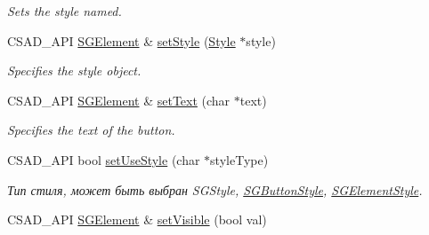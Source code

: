 \begin{DoxyCompactItemize}
\begin{DoxyCompactList}\small\item\em Sets the style named. \end{DoxyCompactList}\item 
\hypertarget{classcsad_1_1_s_g_element_a02334a35ff799bc536e2cf25a53b353e}{C\-S\-A\-D\-\_\-\-A\-P\-I \hyperlink{classcsad_1_1_s_g_element}{S\-G\-Element} \& \hyperlink{classcsad_1_1_s_g_element_a02334a35ff799bc536e2cf25a53b353e}{set\-Style} (\hyperlink{classcsad_1_1_style}{Style} $\ast$style)}\label{classcsad_1_1_s_g_element_a02334a35ff799bc536e2cf25a53b353e}

\begin{DoxyCompactList}\small\item\em Specifies the style object. \end{DoxyCompactList}\item 
\hypertarget{classcsad_1_1_s_g_element_a777e02caefe6abcaa394d0154528bac2}{C\-S\-A\-D\-\_\-\-A\-P\-I \hyperlink{classcsad_1_1_s_g_element}{S\-G\-Element} \& \hyperlink{classcsad_1_1_s_g_element_a777e02caefe6abcaa394d0154528bac2}{set\-Text} (char $\ast$text)}\label{classcsad_1_1_s_g_element_a777e02caefe6abcaa394d0154528bac2}

\begin{DoxyCompactList}\small\item\em Specifies the text of the button. \end{DoxyCompactList}\item 
\hypertarget{classcsad_1_1_s_g_element_a551b2c79b8d094ad1c525601644d0270}{C\-S\-A\-D\-\_\-\-A\-P\-I bool \hyperlink{classcsad_1_1_s_g_element_a551b2c79b8d094ad1c525601644d0270}{set\-Use\-Style} (char $\ast$style\-Type)}\label{classcsad_1_1_s_g_element_a551b2c79b8d094ad1c525601644d0270}

\begin{DoxyCompactList}\small\item\em Тип стиля, может быть выбран S\-G\-Style, \hyperlink{classcsad_1_1_s_g_button_style}{S\-G\-Button\-Style}, \hyperlink{classcsad_1_1_s_g_element_style}{S\-G\-Element\-Style}. \end{DoxyCompactList}\item 
\hypertarget{classcsad_1_1_s_g_element_af7b5b56a228338a9bcf30f2f8cc34a88}{C\-S\-A\-D\-\_\-\-A\-P\-I \hyperlink{classcsad_1_1_s_g_element}{S\-G\-Element} \& \hyperlink{classcsad_1_1_s_g_element_af7b5b56a228338a9bcf30f2f8cc34a88}{set\-Visible} (bool val)}\label{classcsad_1_1_s_g_element_af7b5b56a228338a9bcf30f2f8cc34a88}


\end{DoxyCompactItemize}
